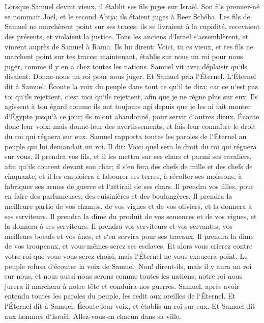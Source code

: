 \chapter{}

\verse Lorsque Samuel devint vieux, il établit ses fils juges sur Israël. 
\verse Son fils premier-né se nommait Joël, et le second Abija; ils étaient juges à Beer Schéba. 
\verse Les fils de Samuel ne marchèrent point sur ses traces; ils se livraient à la cupidité, recevaient des présents, et violaient la justice. 
\verse Tous les anciens d`Israël s`assemblèrent, et vinrent auprès de Samuel à Rama. 
\verse Ils lui dirent: Voici, tu es vieux, et tes fils ne marchent point sur tes traces; maintenant, établis sur nous un roi pour nous juger, comme il y en a chez toutes les nations. 
\verse Samuel vit avec déplaisir qu`ils disaient: Donne-nous un roi pour nous juger. Et Samuel pria l`Éternel. 
\verse L`Éternel dit à Samuel: Écoute la voix du peuple dans tout ce qu`il te dira; car ce n`est pas toi qu`ils rejettent, c`est moi qu`ils rejettent, afin que je ne règne plus sur eux. 
\verse Ils agissent à ton égard comme ils ont toujours agi depuis que je les ai fait monter d`Égypte jusqu`à ce jour; ils m`ont abandonné, pour servir d`autres dieux. 
\verse Écoute donc leur voix; mais donne-leur des avertissements, et fais-leur connaître le droit du roi qui régnera sur eux. 
\verse Samuel rapporta toutes les paroles de l`Éternel au peuple qui lui demandait un roi. 
\verse Il dit: Voici quel sera le droit du roi qui régnera sur vous. Il prendra vos fils, et il les mettra sur ses chars et parmi ses cavaliers, afin qu`ils courent devant son char; 
\verse il s`en fera des chefs de mille et des chefs de cinquante, et il les emploiera à labourer ses terres, à récolter ses moissons, à fabriquer ses armes de guerre et l`attirail de ses chars. 
\verse Il prendra vos filles, pour en faire des parfumeuses, des cuisinières et des boulangères. 
\verse Il prendra la meilleure partie de vos champs, de vos vignes et de vos oliviers, et la donnera à ses serviteurs. 
\verse Il prendra la dîme du produit de vos semences et de vos vignes, et la donnera à ses serviteurs. 
\verse Il prendra vos serviteurs et vos servantes, vos meilleurs boeufs et vos ânes, et s`en servira pour ses travaux. 
\verse Il prendra la dîme de vos troupeaux, et vous-mêmes serez ses esclaves. 
\verse Et alors vous crierez contre votre roi que vous vous serez choisi, mais l`Éternel ne vous exaucera point. 
\verse Le peuple refusa d`écouter la voix de Samuel. Non! dirent-ils, mais il y aura un roi sur nous, 
\verse et nous aussi nous serons comme toutes les nations; notre roi nous jurera il marchera à notre tête et conduira nos guerres. 
\verse Samuel, après avoir entendu toutes les paroles du peuple, les redit aux oreilles de l`Éternel. 
\verse Et l`Éternel dit à Samuel: Écoute leur voix, et établis un roi sur eux. Et Samuel dit aux hommes d`Israël: Allez-vous-en chacun dans sa ville. 

